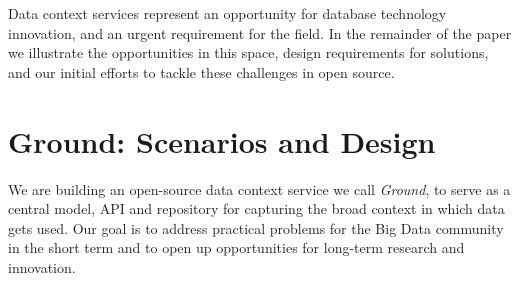 \documentclass{sig-alternate}
\begin{document}

\smallitembot

Data context services represent an opportunity for database technology innovation, and an urgent requirement for the field.
In the remainder of the paper we illustrate the opportunities in this space, design requirements for solutions, and our initial efforts to tackle these challenges in open source.


\section{Ground: Scenarios and Design}
We are building an open-source data context service we call \emph{Ground}, to serve as a central model, API and repository for capturing the broad context in which data gets used. 
Our goal is to address practical problems for the Big Data community in the short term and to open up opportunities for long-term research and innovation.
\end{document}
